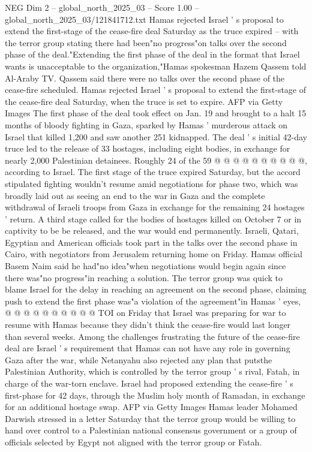 \begin{textsample}{NEG Dim 2 – global\_north\_2025\_03 – Score 1.00 – global\_north\_2025\_03/121841712.txt}  \label{ex:f2_neg_031}
Hamas rejected Israel ' s proposal to extend the first-stage of the cease-fire deal Saturday as the truce expired -- with the terror group stating there had been"no progress"on talks over the second phase of the deal."Extending the first phase of the deal in the format that Israel wants is unacceptable to the organization,"Hamas spokesman Hazem Qassem told Al-Araby TV.
Qassem said there were no talks over the second phase of the cease-fire scheduled.
Hamas rejected Israel ' s proposal to extend the first-stage of the cease-fire deal Saturday, when the truce is set to expire.
AFP via Getty Images The first phase of the deal took effect on Jan. 19 and brought to a halt 15 months of bloody fighting in Gaza, sparked by Hamas ' murderous attack on Israel that killed 1,200 and saw another 251 kidnapped.
The deal ' s initial 42-day truce led to the release of 33 hostages, including eight bodies, in exchange for nearly 2,000 Palestinian detainees.
Roughly 24 of the 59 @ @ @ @ @ @ @ @ @ @, according to Israel.
The first stage of the truce expired Saturday, but the accord stipulated fighting wouldn't resume amid negotiations for phase two, which was broadly laid out as seeing an end to the war in Gaza and the complete withdrawal of Israeli troops from Gaza in exchange for the remaining 24 hostages ' return.
A third stage called for the bodies of hostages killed on October 7 or in captivity to be be released, and the war would end permanently.
Israeli, Qatari, Egyptian and American officials took part in the talks over the second phase in Cairo, with negotiators from Jerusalem returning home on Friday.
Hamas official Basem Naim said he had"no idea"when negotiations would begin again since there was"no progress"in reaching a solution.
The terror group was quick to blame Israel for the delay in reaching an agreement on the second phase, claiming push to extend the first phase was"a violation of the agreement"in Hamas ' eyes, @ @ @ @ @ @ @ @ @ @ TOI on Friday that Israel was preparing for war to resume with Hamas because they didn't think the cease-fire would last longer than several weeks.
Among the challenges frustrating the future of the cease-fire deal are Israel ' s requirement that Hamas can not have any role in governing Gaza after the war, while Netanyahu also rejected any plan that putsthe Palestinian Authority, which is controlled by the terror group ' s rival, Fatah, in charge of the war-torn enclave.
Israel had proposed extending the cease-fire ' s first-phase for 42 days, through the Muslim holy month of Ramadan, in exchange for an additional hostage swap.
AFP via Getty Images Hamas leader Mohamed Darwish stressed in a letter Saturday that the terror group would be willing to hand over control to a Palestinian national consensus government or a group of officials selected by Egypt not aligned with the terror group or Fatah.

\end{textsample}
